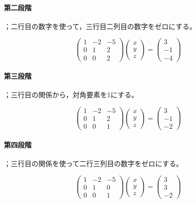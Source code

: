 \documentclass{ltjsbook}
\begin{document}
\paragraph{第二段階}；二行目の数字を使って，三行目二列目の数字をゼロにする。

\[
	\begin{pmatrix} 1 & -2 & -5 \\
                0 & 1  & 2  \\
                0 & 0  & 2\end{pmatrix}
	\begin{pmatrix} x \\ y \\ z \end{pmatrix}
	=
	\begin{pmatrix} 3 \\ -1 \\ -4 \end{pmatrix}
\]

\paragraph{第三段階}；三行目の関係から，対角要素を1にする。

\[
	\begin{pmatrix} 1 & -2 & -5 \\
                0 & 1  & 2  \\
                0 & 0  & 1\end{pmatrix}
	\begin{pmatrix} x \\ y \\ z \end{pmatrix}
	=
	\begin{pmatrix} 3 \\ -1 \\ -2 \end{pmatrix}
\]

\paragraph{第四段階}；三行目の関係を使って二行三列目の数字をゼロにする。

\[
	\begin{pmatrix} 1 & -2 & -5 \\
                0 & 1  & 0  \\
                0 & 0  & 1\end{pmatrix}
	\begin{pmatrix} x \\ y \\ z \end{pmatrix}
	=
	\begin{pmatrix} 3 \\  3 \\ -2 \end{pmatrix}
\]
\end{document}

